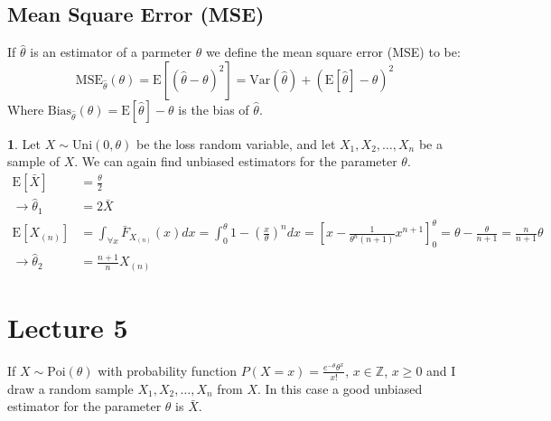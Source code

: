 \documentclass[english,12pt]{article}
\theoremstyle{plain}
\theoremstyle{definition}
\newtheorem*{example}{\protect\examplename}
\theoremstyle{definition} %
\providecommand{\examplename}{Example}
\newcommand{\ex}[1]{\mbox{E} \left[ #1 \right]}
\newcommand{\var}[1]{\mbox{Var} \left( #1 \right)}
\begin{document}
\subsection{Mean Square Error (MSE)}
If $\hat\theta$ is an estimator of a parmeter $\theta$ we define the mean square error (MSE) to be:
\[\text{MSE}_{\hat\theta}(\theta)=\ex{(\hat\theta-\theta)^2}=\var{\hat\theta}+\left(\ex{\hat\theta}-\theta\right)^2\]
Where $\text{Bias}_{\hat\theta}(\theta)=\ex{\hat\theta}-\theta$ is the bias of $\hat\theta$.

\begin{example}
Let $X\sim \text{Uni}(0,\theta)$ be the loss random variable, and let $X_1,X_2,\ldots, X_n$ be a sample of $X$.  We can again find unbiased estimators for the parameter $\theta$.
\begin{align*}
\ex{\bar{X}}&=\frac{\theta}{2}\\
\rightarrow\hat\theta_1&=2\bar{X}\\
\ex{X_{(n)}}&=\int_{\forall x}\bar{F}_{X_{(n)}}(x)dx
=\int_0^\theta 1-\left(\frac{x}{\theta}\right)^ndx
=\left[x-\frac{1}{\theta^n(n+1)}x^{n+1}\right]_0^\theta
=\theta-\frac{\theta}{n+1}
=\frac{n}{n+1}\theta\\
\rightarrow \hat\theta_2&=\frac{n+1}{n}X_{(n)}
\end{align*}
\end{example}

\section*{Lecture 5}
If $X\sim \text{Poi}(\theta)$ with probability function $P(X=x)=\frac{e^{-\theta}\theta^x}{x!}$,  $x\in\mathbb{Z}$, $x\ge 0$ and I draw a random sample $X_1,X_2,\ldots,X_n$ from $X$.  In this case a good unbiased estimator for the parameter $\theta$ is $\bar{X}$.
\end{document}
